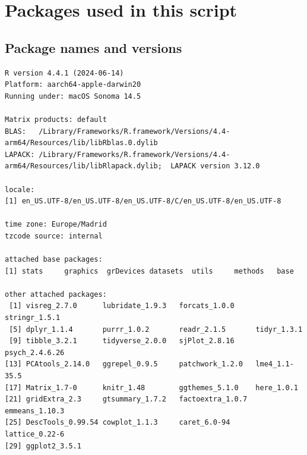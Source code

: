 \documentclass[
  letterpaper,
  DIV=11,
  numbers=noendperiod]{scrreprt}
\begin{document}
\section{Packages used in this
script}\label{packages-used-in-this-script-4}

\subsection{Package names and
versions}\label{package-names-and-versions-4}

\begin{verbatim}
R version 4.4.1 (2024-06-14)
Platform: aarch64-apple-darwin20
Running under: macOS Sonoma 14.5

Matrix products: default
BLAS:   /Library/Frameworks/R.framework/Versions/4.4-arm64/Resources/lib/libRblas.0.dylib 
LAPACK: /Library/Frameworks/R.framework/Versions/4.4-arm64/Resources/lib/libRlapack.dylib;  LAPACK version 3.12.0

locale:
[1] en_US.UTF-8/en_US.UTF-8/en_US.UTF-8/C/en_US.UTF-8/en_US.UTF-8

time zone: Europe/Madrid
tzcode source: internal

attached base packages:
[1] stats     graphics  grDevices datasets  utils     methods   base     

other attached packages:
 [1] visreg_2.7.0      lubridate_1.9.3   forcats_1.0.0     stringr_1.5.1    
 [5] dplyr_1.1.4       purrr_1.0.2       readr_2.1.5       tidyr_1.3.1      
 [9] tibble_3.2.1      tidyverse_2.0.0   sjPlot_2.8.16     psych_2.4.6.26   
[13] PCAtools_2.14.0   ggrepel_0.9.5     patchwork_1.2.0   lme4_1.1-35.5    
[17] Matrix_1.7-0      knitr_1.48        ggthemes_5.1.0    here_1.0.1       
[21] gridExtra_2.3     gtsummary_1.7.2   factoextra_1.0.7  emmeans_1.10.3   
[25] DescTools_0.99.54 cowplot_1.1.3     caret_6.0-94      lattice_0.22-6   
[29] ggplot2_3.5.1    


\end{verbatim}
\end{document}
